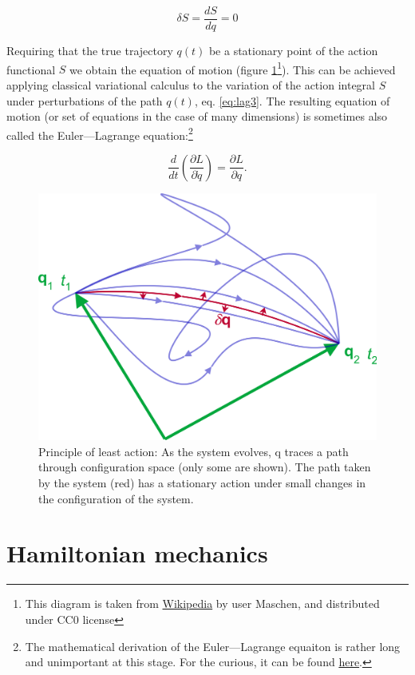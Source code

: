 \documentclass[
  9pt,
]{extbook}
\theoremstyle{definition}
\theoremstyle{definition}
\theoremstyle{definition}
\theoremstyle{remark}
\begin{document}
\begin{equation}
\delta     S = \frac{dS}{dq}= 0
\label{eq:lag3}
\end{equation}

Requiring that the true trajectory \(q(t)\) be a stationary point of the action functional \(S\) we obtain the equation of motion (figure \ref{fig:Fig1c2}\footnote{This diagram is taken from \href{https://en.wikipedia.org}{Wikipedia} by user Maschen, and distributed under CC0 license}). This can be achieved applying classical variational calculus to the variation of the action integral \(S\) under perturbations of the path \(q(t)\), eq. \eqref{eq:lag3}. The resulting equation of motion (or set of equations in the case of many dimensions) is sometimes also called the Euler---Lagrange equation:\footnote{The mathematical derivation of the Euler---Lagrange equaiton is rather long and unimportant at this stage. For the curious, it can be found \href{https://en.wikipedia.org/wiki/Euler–Lagrange_equation}{here}.}

\begin{equation}
\frac{d}{dt}\left(\frac{\partial L}{\partial\dot q}\right)=\frac{\partial L}{\partial q}.
\label{eq:lag4}
\end{equation}

\begin{figure}

{\centering \includegraphics[width=0.7\linewidth]{./img/OEP_wiki1} 

}

\caption{Principle of least action: As the system evolves, q traces a path through configuration space (only some are shown). The path taken by the system (red) has a stationary action under small changes in the configuration of the system.}\label{fig:Fig1c2}
\end{figure}

\hypertarget{hamiltonian-mechanics}{%
\section{Hamiltonian mechanics}\label{hamiltonian-mechanics}}
\end{document}

